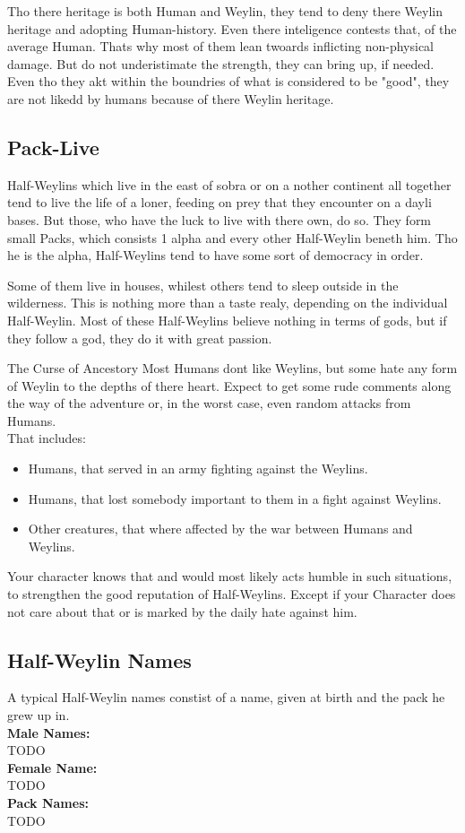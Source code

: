 \documentclass[10pt,twoside,twocolumn,openany]{book}
\begin{document}
Tho there heritage is both Human and Weylin, they tend to deny there Weylin heritage and adopting Human-history. Even there inteligence contests that, of the average Human. Thats why most of them lean twoards inflicting non-physical damage. But do not underistimate the strength, they can bring up, if needed. Even tho they akt within the boundries of what is considered to be "good", they are not likedd by humans because of there Weylin heritage.

\subsection{Pack-Live}
Half-Weylins which live in the east of sobra or on a nother continent all together tend to live the life of a loner, feeding on prey that they encounter on a dayli bases. But those, who have the luck to live with there own, do so. They form small Packs, which consists 1 alpha and every other Half-Weylin beneth him. Tho he is the alpha, Half-Weylins tend to have some sort of democracy in order.

Some of them live in houses, whilest others tend to sleep outside in the wilderness. This is nothing more than a taste realy, depending on the individual Half-Weylin. Most of these Half-Weylins believe nothing in terms of gods, but if they follow a god, they do it with great passion.

\begin{paperbox}{The Curse of Ancestory}
Most Humans dont like Weylins, but some hate any form of Weylin to the depths of there heart. Expect to get some rude comments along the way of the adventure or, in the worst case, even random attacks from Humans.\\
That includes: 
\begin{itemize}
\item Humans, that served in an army fighting against the Weylins.
\item Humans, that lost somebody important to them in a fight against Weylins.
\item Other creatures, that where affected by the war between Humans and Weylins.
\end{itemize}
Your character knows that and would most likely acts humble in such situations, to strengthen the good reputation of Half-Weylins. Except if your Character does not care about that or is marked by the daily hate against him.
\end{paperbox}
\subsection{Half-Weylin Names}
A typical Half-Weylin names constist of a name, given at birth and the pack he grew up in.\\
\textbf{Male Names:}\\
TODO\\
\textbf{Female Name:}\\
TODO\\
\textbf{Pack Names:}\\
TODO\\
\end{document}
